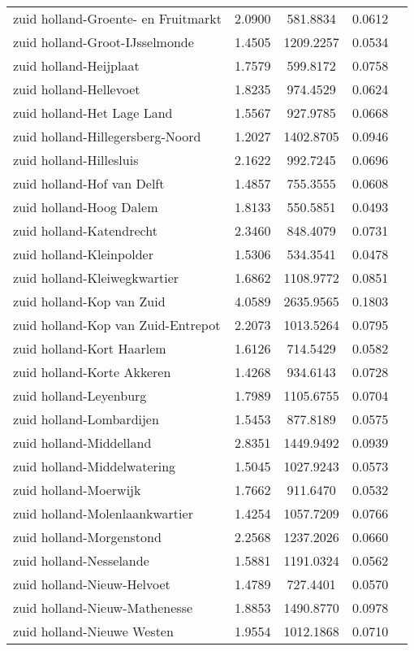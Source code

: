 \begin{longtable}{llccc}
zuid holland-Groente- en Fruitmarkt & 2.0900 & 581.8834 & 0.0612 \\
zuid holland-Groot-IJsselmonde & 1.4505 & 1209.2257 & 0.0534 \\
zuid holland-Heijplaat & 1.7579 & 599.8172 & 0.0758 \\
zuid holland-Hellevoet & 1.8235 & 974.4529 & 0.0624 \\
zuid holland-Het Lage Land & 1.5567 & 927.9785 & 0.0668 \\
zuid holland-Hillegersberg-Noord & 1.2027 & 1402.8705 & 0.0946 \\
zuid holland-Hillesluis & 2.1622 & 992.7245 & 0.0696 \\
zuid holland-Hof van Delft & 1.4857 & 755.3555 & 0.0608 \\
zuid holland-Hoog Dalem & 1.8133 & 550.5851 & 0.0493 \\
zuid holland-Katendrecht & 2.3460 & 848.4079 & 0.0731 \\
zuid holland-Kleinpolder & 1.5306 & 534.3541 & 0.0478 \\
zuid holland-Kleiwegkwartier & 1.6862 & 1108.9772 & 0.0851 \\
zuid holland-Kop van Zuid & 4.0589 & 2635.9565 & 0.1803 \\
zuid holland-Kop van Zuid-Entrepot & 2.2073 & 1013.5264 & 0.0795 \\
zuid holland-Kort Haarlem & 1.6126 & 714.5429 & 0.0582 \\
zuid holland-Korte Akkeren & 1.4268 & 934.6143 & 0.0728 \\
zuid holland-Leyenburg & 1.7989 & 1105.6755 & 0.0704 \\
zuid holland-Lombardijen & 1.5453 & 877.8189 & 0.0575 \\
zuid holland-Middelland & 2.8351 & 1449.9492 & 0.0939 \\
zuid holland-Middelwatering & 1.5045 & 1027.9243 & 0.0573 \\
zuid holland-Moerwijk & 1.7662 & 911.6470 & 0.0532 \\
zuid holland-Molenlaankwartier & 1.4254 & 1057.7209 & 0.0766 \\
zuid holland-Morgenstond & 2.2568 & 1237.2026 & 0.0660 \\
zuid holland-Nesselande & 1.5881 & 1191.0324 & 0.0562 \\
zuid holland-Nieuw-Helvoet & 1.4789 & 727.4401 & 0.0570 \\
zuid holland-Nieuw-Mathenesse & 1.8853 & 1490.8770 & 0.0978 \\
zuid holland-Nieuwe Westen & 1.9554 & 1012.1868 & 0.0710 \\

\end{longtable}
